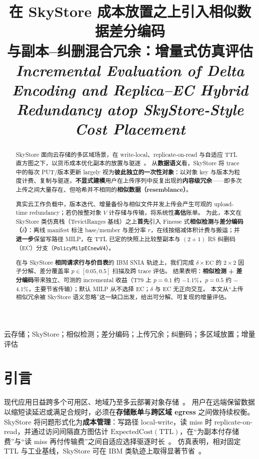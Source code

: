 \documentclass[conference]{IEEEtran}
\title{在 SkyStore 成本放置之上引入相似数据差分编码\\与副本--纠删混合冗余：增量式仿真评估\\[0.4em]
{\normalsize\itshape Incremental Evaluation of Delta Encoding and Replica--EC Hybrid Redundancy atop SkyStore-Style Cost Placement}}
\author{
\IEEEauthorblockN{作者姓名}
\IEEEauthorblockA{\textit{单位院系}\\
城市，国家\\
\texttt{email@example.edu}}
}
\begin{document}
\maketitle

\begin{abstract}
SkyStore 面向云存储的多区域场景，在 write-local、replicate-on-read 与自适应 TTL 直方图之下，以货币成本优化副本的放置与驱逐~\cite{skystore2025}。
从\textbf{数据语义}看，SkyStore 将 trace 中的每次 PUT/版本更新 largely 视为\textbf{彼此独立的一次性对象}：以对象 key 与版本为粒度计费、复制与驱逐，\textbf{不显式建模}用户在上传序列中反复出现的\textbf{内容级冗余}——即多次上传之间大量存在、但哈希并不相同的\textbf{相似数据（resemblance）}。

真实云工作负载中，版本迭代、增量备份与相似文件并发上传会产生可观的 upload-time redundancy；若仍按整对象 $V$ 计存储与传输，将系统性\textbf{高估}账单。
为此，本文在 SkyStore 类仿真栈（TevictRanges 基线）之上\textbf{首先}引入 Finesse 式\textbf{相似检测}与\textbf{差分编码（$\delta$）}：离线 manifest 标注 base/member 与差分率 $r$，在线按缩减体积计费与搬运；并\textbf{进一步}保留写路径 MILP，在 TTL 已定的快照上比较整副本与 $(2{+}1)$ RS 纠删码（EC）分支（\texttt{PolicyMilpECnewV4}）。

在与 SkyStore \textbf{相同请求行与价目表}的 IBM SNIA 轨迹上，我们完成 $\delta{\times}\mathrm{EC}$ 的 $2{\times}2$ 因子分解、差分覆盖率 $p\in[0.05,0.5]$ 扫描及跨 trace 评估。
结果表明：\textbf{相似检测 + 差分编码}带来独立、可测的 incremental 收益（T79 上 $p{=}0.1$ 约 $-$1.1\%，$p{=}0.5$ 约 $-$4.1\%，主要节省传输）；默认 MILP 从不选择 EC；$\delta$ 与 EC 无正向交互。
本文从``上传相似冗余被 SkyStore 语义忽略''这一缺口出发，给出可分解、可复现的增量评估。
\end{abstract}

\begin{IEEEkeywords}
云存储；SkyStore；相似检测；差分编码；上传冗余；纠删码；多区域放置；增量评估
\end{IEEEkeywords}

\section{引言}
\label{sec:intro}

现代应用日益跨多个可用区、地域乃至多云部署对象存储~\cite{skystore2025}。
用户在远端保留数据以缩短读延迟或满足合规时，必须在\textbf{存储账单}与\textbf{跨区域 egress} 之间做持续权衡。
SkyStore 将问题形式化为\textbf{成本管理}：写路径 local-write，读 miss 时 replicate-on-read，并通过访问间隔直方图估计 $\mathrm{ExpectedCost}(\mathrm{TTL})$，在``为副本付存储费''与``读 miss 再付传输费''之间自适应选择驱逐时长~\cite{skystore2025}。
仿真表明，相对固定 TTL 与工业基线，SkyStore 可在 IBM 类轨迹上取得显著节省~\cite{skystore2025,snia_ibm2019}。
\end{document}
